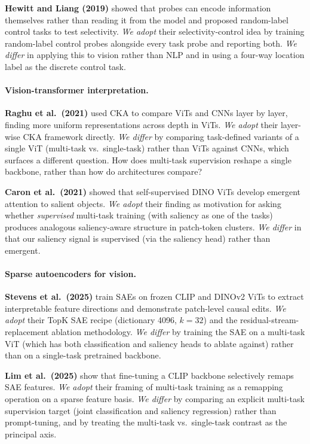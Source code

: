 \documentclass{article}
\begin{document}
\textbf{Hewitt and Liang (2019)} showed that probes can encode information themselves rather than reading it from the model and proposed random-label control tasks to test selectivity. \emph{We adopt} their selectivity-control idea by training random-label control probes alongside every task probe and reporting both. \emph{We differ} in applying this to vision rather than NLP and in using a four-way location label as the discrete control task.

\paragraph{Vision-transformer interpretation.}
\textbf{Raghu et al.\ (2021)} used CKA to compare ViTs and CNNs layer by layer, finding more uniform representations across depth in ViTs. \emph{We adopt} their layer-wise CKA framework directly. \emph{We differ} by comparing task-defined variants of a single ViT (multi-task vs.\ single-task) rather than ViTs against CNNs, which surfaces a different question. How does multi-task supervision reshape a single backbone, rather than how do architectures compare?

\textbf{Caron et al.\ (2021)} showed that self-supervised DINO ViTs develop emergent attention to salient objects. \emph{We adopt} their finding as motivation for asking whether \emph{supervised} multi-task training (with saliency as one of the tasks) produces analogous saliency-aware structure in patch-token clusters. \emph{We differ} in that our saliency signal is supervised (via the saliency head) rather than emergent.

\paragraph{Sparse autoencoders for vision.}
\textbf{Stevens et al.\ (2025)} train SAEs on frozen CLIP and DINOv2 ViTs to extract interpretable feature directions and demonstrate patch-level causal edits. \emph{We adopt} their TopK SAE recipe (dictionary 4096, $k = 32$) and the residual-stream-replacement ablation methodology. \emph{We differ} by training the SAE on a multi-task ViT (which has both classification and saliency heads to ablate against) rather than on a single-task pretrained backbone.

\textbf{Lim et al.\ (2025)} show that fine-tuning a CLIP backbone selectively remaps SAE features. \emph{We adopt} their framing of multi-task training as a remapping operation on a sparse feature basis. \emph{We differ} by comparing an explicit multi-task supervision target (joint classification and saliency regression) rather than prompt-tuning, and by treating the multi-task vs.\ single-task contrast as the principal axis.
\end{document}
